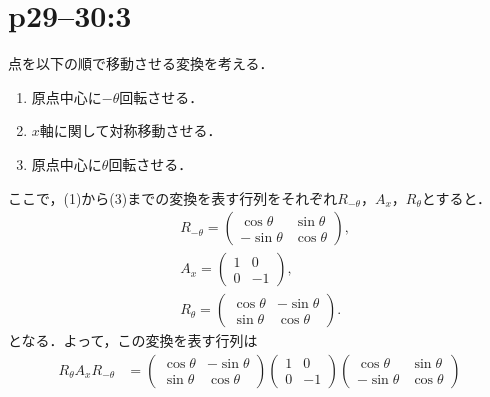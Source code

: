 \documentclass[a4paper,10pt,fleqn]{ltjsarticle}
\begin{document}
\section*{p29--30:3}

\begin{tleftbar}
    点を以下の順で移動させる変換を考える．
    \begin{enumerate}
        \item 原点中心に$-\theta$回転させる．
        \item $x$軸に関して対称移動させる．
        \item 原点中心に$\theta$回転させる．
    \end{enumerate}
    ここで，(1)から(3)までの変換を表す行列をそれぞれ$R_{-\theta}$，$A_{x}$，$R_{\theta}$とすると．
    \begin{align*}
         & R_{-\theta} = \begin{pmatrix} \cos \theta & \sin \theta \\ -\sin \theta & \cos \theta \end{pmatrix} , \\
         & A_{x} = \begin{pmatrix} 1 & 0 \\ 0 & -1 \end{pmatrix} ,                                               \\
         & R_{\theta} = \begin{pmatrix} \cos \theta & -\sin \theta \\ \sin \theta & \cos \theta \end{pmatrix} .
    \end{align*}
    となる．よって，この変換を表す行列は
    \begin{align*}
        R_{\theta} A_x R_{-\theta} & =\begin{pmatrix} \cos \theta & -\sin \theta \\ \sin \theta & \cos \theta \end{pmatrix}
        \begin{pmatrix} 1 & 0 \\ 0 & -1 \end{pmatrix}
        \begin{pmatrix} \cos \theta & \sin \theta \\ -\sin \theta & \cos \theta \end{pmatrix}                                                                                                \\

\end{align*}
\end{tleftbar}
\end{document}
